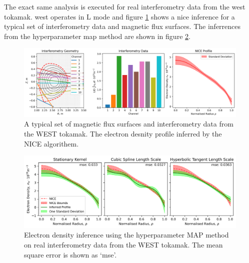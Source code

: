 The exact same analysis is executed for real interferometry data from the \gls{west} tokamak. \gls{west} operates in L mode and figure \ref{fig:interf_nice} shows a \gls{nice} inference for a typical set of interferometry data and magnetic flux surfaces. The inferrences from the hyperparameter \gls{map} method are shown in figure \ref{fig:map_real}. 

\begin{figure}[ht]
    \centering
    \includegraphics[width=500pt]{images/Final/interferometry_nice.png}
    \caption{A typical set of magnetic flux surfaces and interferometry data from the WEST tokamak. The electron desnity profile inferred by the NICE algorithem.}
    \label{fig:interf_nice}
\end{figure}

\begin{figure}[ht]
    \centering
    \includegraphics[width=\textwidth]{images/Final/NICE_real_map_likep.png}
    \caption{Electron density inference using the hyperparameter MAP method on real interferometry data from the WEST tokamak. The mean square error is shown as `mse'.}
    \label{fig:map_real}
\end{figure}





